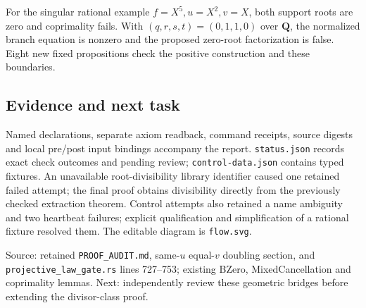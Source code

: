 \documentclass[10pt]{article}
\begin{document}
For the singular rational example $f=X^5,u=X^2,v=X$, both support roots are zero and coprimality fails. With $(q,r,s,t)=(0,1,1,0)$ over $\mathbf Q$, the normalized branch equation is nonzero and the proposed zero-root factorization is false. Eight new fixed propositions check the positive construction and these boundaries.
\subsection*{Evidence and next task}
Named declarations, separate axiom readback, command receipts, source digests and local pre/post input bindings accompany the report. \texttt{status.json} records exact check outcomes and pending review; \texttt{control-data.json} contains typed fixtures. An unavailable root-divisibility library identifier caused one retained failed attempt; the final proof obtains divisibility directly from the previously checked extraction theorem. Control attempts also retained a name ambiguity and two heartbeat failures; explicit qualification and simplification of a rational fixture resolved them. The editable diagram is \texttt{flow.svg}.

Source: retained \texttt{PROOF\_AUDIT.md}, same-$u$ equal-$v$ doubling section, and \texttt{projective\_law\_gate.rs} lines 727--753; existing BZero, MixedCancellation and coprimality lemmas. Next: independently review these geometric bridges before extending the divisor-class proof.
\end{document}

